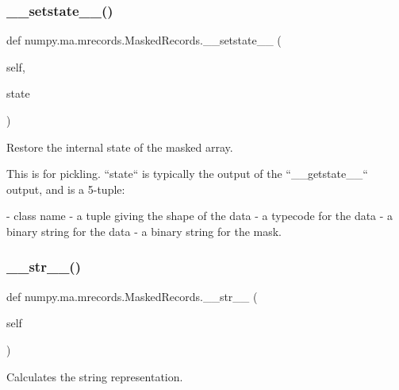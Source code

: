 \subsubsection{\texorpdfstring{\+\_\+\+\_\+setstate\+\_\+\+\_\+()}{\_\_setstate\_\_()}}
{\footnotesize\ttfamily def numpy.\+ma.\+mrecords.\+Masked\+Records.\+\_\+\+\_\+setstate\+\_\+\+\_\+ (\begin{DoxyParamCaption}\item[{}]{self,  }\item[{}]{state }\end{DoxyParamCaption})}

\begin{DoxyVerb}Restore the internal state of the masked array.

This is for pickling.  ``state`` is typically the output of the
``__getstate__`` output, and is a 5-tuple:

- class name
- a tuple giving the shape of the data
- a typecode for the data
- a binary string for the data
- a binary string for the mask.\end{DoxyVerb}
 \mbox{\label{classnumpy_1_1ma_1_1mrecords_1_1MaskedRecords_af2bd0705461307ea59803871c4bfd826}} 
\subsubsection{\texorpdfstring{\+\_\+\+\_\+str\+\_\+\+\_\+()}{\_\_str\_\_()}}
{\footnotesize\ttfamily def numpy.\+ma.\+mrecords.\+Masked\+Records.\+\_\+\+\_\+str\+\_\+\+\_\+ (\begin{DoxyParamCaption}\item[{}]{self }\end{DoxyParamCaption})}

\begin{DoxyVerb}Calculates the string representation.\end{DoxyVerb}
 \mbox{\label{classnumpy_1_1ma_1_1mrecords_1_1MaskedRecords_af8828d46015f1ab2db803151727beeb9}} 
